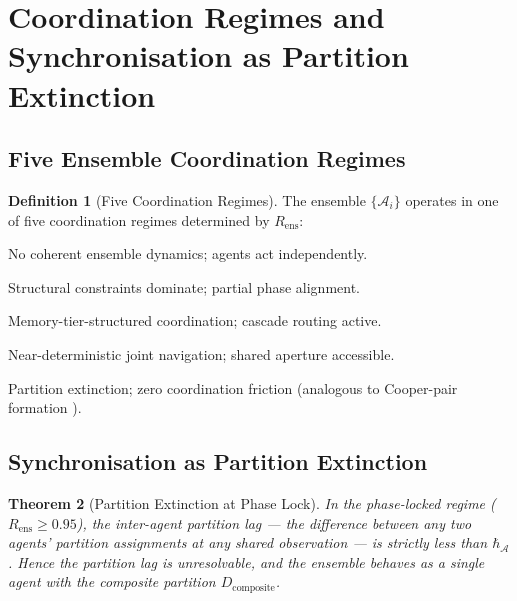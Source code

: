 \documentclass[twocolumn,11pt,a4paper]{article}
\theoremstyle{plain}
\newtheorem{theorem}{Theorem}[section]
\theoremstyle{definition}
\newtheorem{definition}[theorem]{Definition}
\theoremstyle{remark}
\begin{document}
\section{Coordination Regimes and Synchronisation as Partition Extinction}
\label{sec:coordination_regimes}

\subsection{Five Ensemble Coordination Regimes}

\begin{definition}[Five Coordination Regimes]
\label{def:coord_regimes}
The ensemble $\{\mathcal{A}_i\}$ operates in one of five coordination regimes determined by $R_\mathrm{ens}$:
\begin{description}[leftmargin=2.5em,style=nextline,font=\normalfont\bfseries]
  \item[Turbulent ($R_\mathrm{ens} < 0.3$)] No coherent ensemble dynamics; agents act independently.
  \item[Aperture-Dominated ($R_\mathrm{ens} \in [0.3, 0.5)$)] Structural constraints dominate; partial phase alignment.
  \item[Hierarchical Cascade ($R_\mathrm{ens} \in [0.5, 0.8)$)] Memory-tier-structured coordination; cascade routing active.
  \item[Coherent ($R_\mathrm{ens} \in [0.8, 0.95)$)] Near-deterministic joint navigation; shared aperture accessible.
  \item[Phase-Locked ($R_\mathrm{ens} \ge 0.95$)] Partition extinction; zero coordination friction (analogous to Cooper-pair formation \citep{cooper1956,bardeen1957}).
\end{description}
\end{definition}

\subsection{Synchronisation as Partition Extinction}

\begin{theorem}[Partition Extinction at Phase Lock]
\label{thm:partition_extinction}
In the phase-locked regime ($R_\mathrm{ens} \ge 0.95$), the inter-agent partition lag — the difference between any two agents' partition assignments at any shared observation — is strictly less than $\hbar_{\mathcal{A}}$.  Hence the partition lag is unresolvable, and the ensemble behaves as a single agent with the composite partition $D_\mathrm{composite}$.
\end{theorem}
\end{document}

